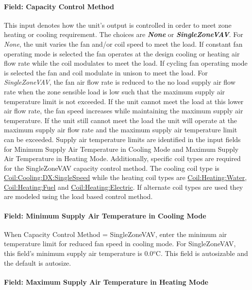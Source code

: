 \paragraph{Field: Capacity Control Method}\label{field-capacity-control-method-2}

This input denotes how the unit's output is controlled in order to meet zone heating or cooling requirement. The choices are \textbf{\emph{None}} or \textbf{\emph{SingleZoneVAV}}. For \emph{None}, the unit varies the fan and/or coil speed to meet the load. If constant fan operating mode is selected the fan operates at the design cooling or heating air flow rate while the coil modulates to meet the load. If cycling fan operating mode is selected the fan and coil modulate in unison to meet the load. For \emph{SingleZoneVAV}, the fan air flow rate is reduced to the no load supply air flow rate when the zone sensible load is low such that the maximum supply air temperature limit is not exceeded. If the unit cannot meet the load at this lower air flow rate, the fan speed increases while maintaining the maximum supply air temperature. If the unit still cannot meet the load the unit will operate at the maximum supply air flow rate and the maximum supply air temperature limit can be exceeded. Supply air temperature limits are identified in the input fields for Minimum Supply Air Temperature in Cooling Mode and Maximum Supply Air Temperature in Heating Mode. Additionally, specific coil types are required for the SingleZoneVAV capacity control method. The cooling coil type is \hyperref[coilcoolingdxsinglespeed]{Coil:Cooling:DX:SingleSpeed} while the heating coil types are \hyperref[coilheatingwater]{Coil:Heating:Water}, \hyperref[coilheatinggas-000]{Coil:Heating:Fuel} and \hyperref[coilheatingelectric]{Coil:Heating:Electric}. If alternate coil types are used they are modeled using the load based control method.

\paragraph{Field: Minimum Supply Air Temperature in Cooling Mode}\label{field-minimum-supply-air-temperature-in-cooling-mode-2}

When Capacity Control Method = SingleZoneVAV, enter the minimum air temperature limit for reduced fan speed in cooling mode. For SingleZoneVAV, this field's minimum supply air temperature is 0.0\(^{o}\)\si{C}. This field is autosizable and the default is autosize.

\paragraph{Field: Maximum Supply Air Temperature in Heating Mode}\label{field-maximum-supply-air-temperature-in-heating-mode-2}

